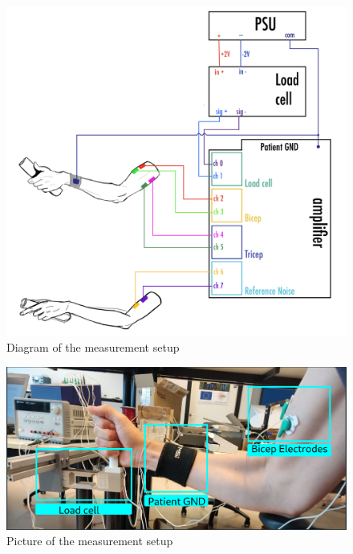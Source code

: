 \begin{figure}[h!t]
	\begin{center}
		\includegraphics[width=1.0\columnwidth]{images/measurement_setup_diagram.png}
	\end{center}
	\caption{Diagram of the measurement setup}
	\label{fig:measurement_setup_diagram}
\end{figure}

\begin{figure}[h!t]
	\begin{center}
		\includegraphics[width=1.0\columnwidth]{images/setup_photo.png}
	\end{center}
	\caption{Picture of the measurement setup}
	\label{fig:measurement_setup_photo}
\end{figure}

